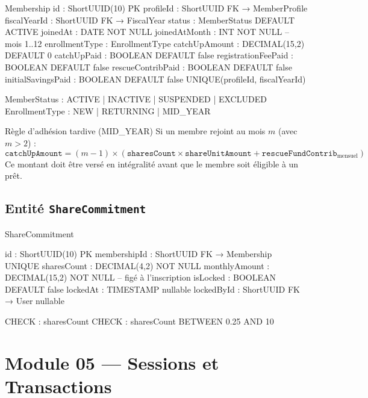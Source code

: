 \documentclass[12pt, a4paper]{report}
\begin{document}
\begin{codeBox}
Membership {
  id                  : ShortUUID(10)   PK
  profileId           : ShortUUID       FK → MemberProfile
  fiscalYearId        : ShortUUID       FK → FiscalYear
  status              : MemberStatus    DEFAULT ACTIVE
  joinedAt            : DATE            NOT NULL
  joinedAtMonth       : INT             NOT NULL  -- mois 1..12
  enrollmentType      : EnrollmentType
  catchUpAmount       : DECIMAL(15,2)   DEFAULT 0
  catchUpPaid         : BOOLEAN         DEFAULT false
  registrationFeePaid : BOOLEAN         DEFAULT false
  rescueContribPaid   : BOOLEAN         DEFAULT false
  initialSavingsPaid  : BOOLEAN         DEFAULT false
  UNIQUE(profileId, fiscalYearId)
}

MemberStatus   : ACTIVE | INACTIVE | SUSPENDED | EXCLUDED
EnrollmentType : NEW | RETURNING | MID_YEAR
\end{codeBox}

\begin{ruleBox}{Règle d'adhésion tardive (MID\_YEAR)}
Si un membre rejoint au mois $m$ (avec $m > 2$) :
$$\texttt{catchUpAmount} = (m - 1) \times (\texttt{sharesCount} \times \texttt{shareUnitAmount} + \texttt{rescueFundContrib}_\text{mensuel})$$
Ce montant doit être versé en intégralité avant que le membre soit éligible à un prêt.
\end{ruleBox}

\subsection{Entité \texttt{ShareCommitment}}

\begin{codeBox}
ShareCommitment {
  id              : ShortUUID(10)  PK
  membershipId    : ShortUUID      FK → Membership  UNIQUE
  sharesCount     : DECIMAL(4,2)   NOT NULL
  monthlyAmount   : DECIMAL(15,2)  NOT NULL  -- figé à l'inscription
  isLocked        : BOOLEAN        DEFAULT false
  lockedAt        : TIMESTAMP      nullable
  lockedById      : ShortUUID FK → User  nullable

  CHECK : sharesCount %
  CHECK : sharesCount BETWEEN 0.25 AND 10
}
\end{codeBox}

\section{Module 05 — Sessions et Transactions}
\end{document}
